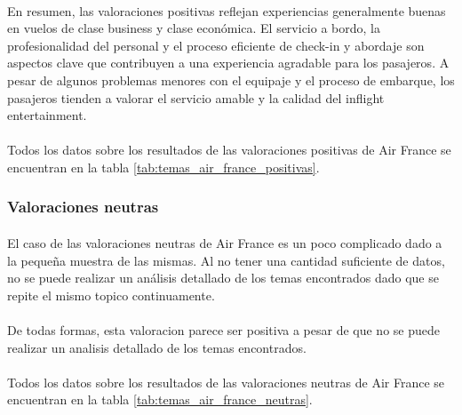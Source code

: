 \documentclass{report}
\begin{document}
                    \paragraph*{}{
                        En resumen, las valoraciones positivas reflejan experiencias generalmente buenas en vuelos de clase business y clase económica. El servicio a bordo, la profesionalidad del personal y el proceso eficiente de check-in y abordaje son aspectos clave que contribuyen a una experiencia agradable para los pasajeros. A pesar de algunos problemas menores con el equipaje y el proceso de embarque, los pasajeros tienden a valorar el servicio amable y la calidad del inflight entertainment.
                    }
                    \paragraph*{}{
                        Todos los datos sobre los resultados de las valoraciones positivas de Air France se encuentran en la tabla \ref{tab:temas_air_france_positivas}.
                    }
                \subsubsection*{Valoraciones neutras}
                    \paragraph*{}{
                        El caso de las valoraciones neutras de Air France es un poco complicado dado a la pequeña muestra de las mismas.
                        Al no tener una cantidad suficiente de datos, no se puede realizar un análisis detallado de los temas encontrados dado que se repite el mismo topico continuamente.
                    }
                    \paragraph*{}{
                        De todas formas, esta valoracion parece ser positiva a pesar de que no se puede realizar un analisis detallado de los temas encontrados.
                    }
                    \paragraph*{}{
                        Todos los datos sobre los resultados de las valoraciones neutras de Air France se encuentran en la tabla \ref{tab:temas_air_france_neutras}.
                    }
\end{document}
